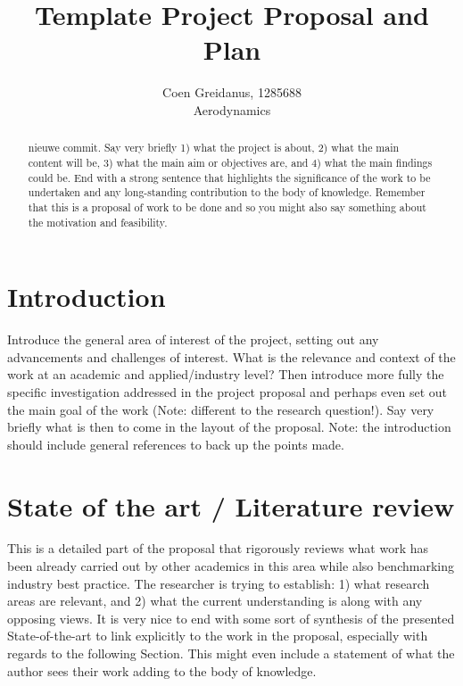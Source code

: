 \documentclass{article}
\title{Template Project Proposal and Plan}
\author{Coen Greidanus, 1285688\\
Aerodynamics}
\begin{document}
\maketitle

\begin{abstract}

nieuwe commit. Say very briefly 1) what the project is about, 2) what the main content will be, 3) what the main aim or objectives are, and 4) what the main findings could be. End with a strong sentence that highlights the significance of the work to be undertaken and any long-standing contribution to the body of knowledge. Remember that this is a proposal of work to be done and so you might also say something about the motivation and feasibility.

\end{abstract}

\section{Introduction}
\label{sec:intro}

Introduce the general area of interest of the project, setting out any advancements and challenges of interest. What is the relevance and context of the work at an academic and applied/industry level? Then introduce more fully the specific investigation addressed in the project proposal and perhaps even set out the main goal of the work (Note: different to the research question!). Say very briefly what is then to come in the layout of the proposal. Note: the introduction should include general references to back up the points made.

\section{State of the art / Literature review}
\label{sec:litreview}

This is a detailed part of the proposal that rigorously reviews what work has been already carried out by other academics in this area while also benchmarking industry best practice. The researcher is trying to establish: 1) what research areas are relevant, and 2) what the current understanding is along with any opposing views. It is very nice to end with some sort of synthesis of the presented State-of-the-art to link explicitly to the work in the proposal, especially with regards to the following Section. This might even include a statement of what the author sees their work adding to the body of knowledge.
\end{document}

